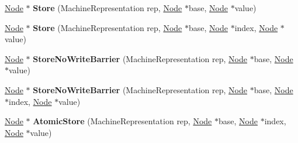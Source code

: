 \begin{DoxyCompactItemize}
\item 
\hyperlink{classv8_1_1internal_1_1compiler_1_1_node}{Node} $\ast$ {\bfseries Store} (Machine\+Representation rep, \hyperlink{classv8_1_1internal_1_1compiler_1_1_node}{Node} $\ast$base, \hyperlink{classv8_1_1internal_1_1compiler_1_1_node}{Node} $\ast$value)\hypertarget{classv8_1_1internal_1_1compiler_1_1_code_assembler_a7b6b1a8131d3e0146284d79f7cddbbf6}{}\label{classv8_1_1internal_1_1compiler_1_1_code_assembler_a7b6b1a8131d3e0146284d79f7cddbbf6}

\item 
\hyperlink{classv8_1_1internal_1_1compiler_1_1_node}{Node} $\ast$ {\bfseries Store} (Machine\+Representation rep, \hyperlink{classv8_1_1internal_1_1compiler_1_1_node}{Node} $\ast$base, \hyperlink{classv8_1_1internal_1_1compiler_1_1_node}{Node} $\ast$index, \hyperlink{classv8_1_1internal_1_1compiler_1_1_node}{Node} $\ast$value)\hypertarget{classv8_1_1internal_1_1compiler_1_1_code_assembler_a23664af10b986e77118c58ef2726a8b7}{}\label{classv8_1_1internal_1_1compiler_1_1_code_assembler_a23664af10b986e77118c58ef2726a8b7}

\item 
\hyperlink{classv8_1_1internal_1_1compiler_1_1_node}{Node} $\ast$ {\bfseries Store\+No\+Write\+Barrier} (Machine\+Representation rep, \hyperlink{classv8_1_1internal_1_1compiler_1_1_node}{Node} $\ast$base, \hyperlink{classv8_1_1internal_1_1compiler_1_1_node}{Node} $\ast$value)\hypertarget{classv8_1_1internal_1_1compiler_1_1_code_assembler_a227bb5d4d9104f293a941dd1de3dde72}{}\label{classv8_1_1internal_1_1compiler_1_1_code_assembler_a227bb5d4d9104f293a941dd1de3dde72}

\item 
\hyperlink{classv8_1_1internal_1_1compiler_1_1_node}{Node} $\ast$ {\bfseries Store\+No\+Write\+Barrier} (Machine\+Representation rep, \hyperlink{classv8_1_1internal_1_1compiler_1_1_node}{Node} $\ast$base, \hyperlink{classv8_1_1internal_1_1compiler_1_1_node}{Node} $\ast$index, \hyperlink{classv8_1_1internal_1_1compiler_1_1_node}{Node} $\ast$value)\hypertarget{classv8_1_1internal_1_1compiler_1_1_code_assembler_aa806ae986349cf52c5feecda4040a5df}{}\label{classv8_1_1internal_1_1compiler_1_1_code_assembler_aa806ae986349cf52c5feecda4040a5df}

\item 
\hyperlink{classv8_1_1internal_1_1compiler_1_1_node}{Node} $\ast$ {\bfseries Atomic\+Store} (Machine\+Representation rep, \hyperlink{classv8_1_1internal_1_1compiler_1_1_node}{Node} $\ast$base, \hyperlink{classv8_1_1internal_1_1compiler_1_1_node}{Node} $\ast$index, \hyperlink{classv8_1_1internal_1_1compiler_1_1_node}{Node} $\ast$value)\hypertarget{classv8_1_1internal_1_1compiler_1_1_code_assembler_a686d28f6be4b45f8a12e1df6ffcc9fed}{}\label{classv8_1_1internal_1_1compiler_1_1_code_assembler_a686d28f6be4b45f8a12e1df6ffcc9fed}


\end{DoxyCompactItemize}
